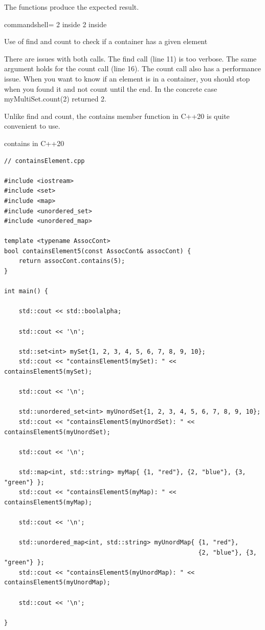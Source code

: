 The functions produce the expected result.

\begin{tcblisting}{commandshell={}}
2 inside
2 inside
\end{tcblisting}

\begin{center}
Use of find and count to check if a container has a given element
\end{center}

There are issues with both calls. The find call (line 11) is too verbose. The same argument holds for the count call (line 16). The count call also has a performance issue. When you want to know if an element is in a container, you should stop when you found it and not count until the end. In the concrete case myMultiSet.count(2) returned 2.

Unlike find and count, the contains member function in C++20 is quite convenient to use.

\noindent
contains in C++20
\begin{lstlisting}[style=styleCXX]
// containsElement.cpp

#include <iostream>
#include <set>
#include <map>
#include <unordered_set>
#include <unordered_map>

template <typename AssocCont>
bool containsElement5(const AssocCont& assocCont) {
	return assocCont.contains(5);
}

int main() {

	std::cout << std::boolalpha;
	
	std::cout << '\n';
	
	std::set<int> mySet{1, 2, 3, 4, 5, 6, 7, 8, 9, 10};
	std::cout << "containsElement5(mySet): " << containsElement5(mySet);
	
	std::cout << '\n';
	
	std::unordered_set<int> myUnordSet{1, 2, 3, 4, 5, 6, 7, 8, 9, 10};
	std::cout << "containsElement5(myUnordSet): " << containsElement5(myUnordSet);
	
	std::cout << '\n';
	
	std::map<int, std::string> myMap{ {1, "red"}, {2, "blue"}, {3, "green"} };
	std::cout << "containsElement5(myMap): " << containsElement5(myMap);
	
	std::cout << '\n';
	
	std::unordered_map<int, std::string> myUnordMap{ {1, "red"},
	                                                 {2, "blue"}, {3, "green"} };
	std::cout << "containsElement5(myUnordMap): " << containsElement5(myUnordMap);
	
	std::cout << '\n';

}
\end{lstlisting}

